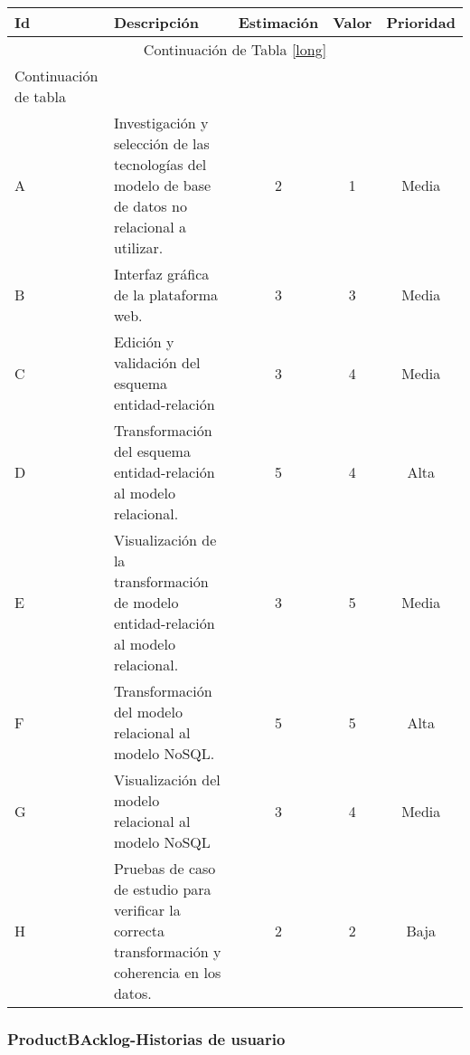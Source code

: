 \begin{longtable}{ p{.7cm} | p{8cm} | c | c | c }

	\hline

	\textbf{Id} & \textbf{Descripción } & \textbf{Estimación } & \textbf{Valor }  & \textbf{Prioridad }\\
	\hline
	\hline

	\endfirsthead

	\multicolumn{5}{c}{Continuación de Tabla \ref{long}}\\
	\hline
	Continuación de tabla\\
	\hline
	\endhead

	\hline
	\endfoot

	A & Investigación y selección de las tecnologías del modelo de base de datos no relacional a utilizar. & 2 & 1 & Media \\[.4cm]
	B & Interfaz gráfica de la plataforma web. & 3 & 3 & Media\\[.4cm]
	C & Edición y validación del esquema entidad-relación & 3 & 4 & Media \\[.4cm]
	D & Transformación del esquema entidad-relación al modelo relacional. & 5 & 4 & Alta \\[.4cm]
	E & Visualización de la transformación de modelo entidad-relación al modelo relacional. & 3 & 5 & Media \\[.4cm]
	F & Transformación del modelo relacional al modelo NoSQL. & 5 & 5 & Alta \\[.4cm]
	G & Visualización del modelo relacional al modelo NoSQL & 3 & 4 & Media \\[.4cm]
	H & Pruebas de caso de estudio para verificar la correcta transformación y coherencia en los datos. & 2 & 2 & Baja \\[.4cm]

\end{longtable}

\subsubsection{ProductBAcklog-Historias de usuario}

